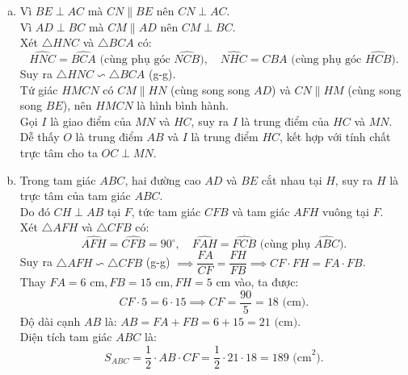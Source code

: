 \begin{bt}
{\begin{enumerate}[a)]
    Vậy tứ giác $CEHD$ nội tiếp đường tròn đường kính $CH$.
    \item Vì $BE \perp AC$ mà $CN \parallel BE$ nên $CN \perp AC$.\\
    Vì $AD \perp BC$ mà $CM \parallel AD$ nên $CM \perp BC$.\\
    Xét $\triangle HNC$ và $\triangle BCA$ có:
    $$\widehat{HNC} = \widehat{BCA}\text{ (cùng phụ góc } \widehat{NCB}\text{)}, \quad \widehat{NHC} = \widehat{CBA}\text{ (cùng phụ góc } \widehat{HCB}\text{)}.$$
    Suy ra $\triangle HNC \backsim \triangle BCA$ (g-g).\\
    Tứ giác $HMCN$ có $CM \parallel HN$ (cùng song song $AD$) và $CN \parallel HM$ (cùng song song $BE$), nên $HMCN$ là hình bình hành.\\
    Gọi $I$ là giao điểm của $MN$ và $HC$, suy ra $I$ là trung điểm của $HC$ và $MN$.\\
    Dễ thấy $O$ là trung điểm $AB$ và $I$ là trung điểm $HC$, kết hợp với tính chất trực tâm cho ta $OC \perp MN$.
    \item Trong tam giác $ABC$, hai đường cao $AD$ và $BE$ cắt nhau tại $H$, suy ra $H$ là trực tâm của tam giác $ABC$.\\
    Do đó $CH \perp AB$ tại $F$, tức tam giác $CFB$ và tam giác $AFH$ vuông tại $F$.\\
    Xét $\triangle AFH$ và $\triangle CFB$ có:
    $$\widehat{AFH} = \widehat{CFB} = 90^\circ, \quad \widehat{FAH} = \widehat{FCB}\text{ (cùng phụ } \widehat{ABC}\text{)}.$$
    Suy ra $\triangle AFH \backsim \triangle CFB$ (g-g) $\implies \dfrac{FA}{CF} = \dfrac{FH}{FB} \implies CF \cdot FH = FA \cdot FB$.\\
    Thay $FA = 6\text{ cm}, FB = 15\text{ cm}, FH = 5\text{ cm}$ vào, ta được:
    $$CF \cdot 5 = 6 \cdot 15 \implies CF = \dfrac{90}{5} = 18\text{ (cm)}.$$
    Độ dài cạnh $AB$ là: $AB = FA + FB = 6 + 15 = 21\text{ (cm)}$.\\
    Diện tích tam giác $ABC$ là:
    $$S_{ABC} = \dfrac{1}{2} \cdot AB \cdot CF = \dfrac{1}{2} \cdot 21 \cdot 18 = 189\text{ (cm}^2\text{)}.$$
\end{enumerate}
}
\end{bt}

